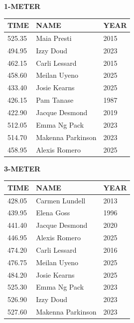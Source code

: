 \begin{table}[H]
\centering
\begin{minipage}[t]{0.6\textwidth}
\centering
\textbf{1-METER}\\[0.1cm]
\begin{tabular}{@{}p{1.8cm}p{2.8cm}p{1.2cm}@{}}
\hline
    \textbf{TIME} & \textbf{NAME} & \textbf{YEAR} \\
\hline
    525.35 & Maia Presti & 2015 \\
    494.95 & Izzy Doud & 2023 \\
    462.15 & Carli Lessard & 2015 \\
    458.60 & Meilan Uyeno & 2025 \\
    433.40 & Josie Kearns & 2025 \\
    426.15 & Pam Tanase & 1987 \\
    422.90 & Jacque Desmond & 2019 \\
    512.05 & Emma Ng Pack & 2023 \\
    514.70 & Makenna Parkinson & 2023 \\
    458.95 & Alexis Romero & 2025 \\
\hline
\end{tabular}
\end{minipage}
\end{table}

\begin{table}[H]
\centering
\begin{minipage}[t]{0.6\textwidth}
\centering
\textbf{3-METER}\\[0.1cm]
\begin{tabular}{@{}p{1.8cm}p{2.8cm}p{1.2cm}@{}}
\hline
    \textbf{TIME} & \textbf{NAME} & \textbf{YEAR} \\
\hline
    428.05 & Carmen Lundell & 2013 \\
    439.95 & Elena Goss & 1996 \\
    441.40 & Jacque Desmond & 2020 \\
    446.95 & Alexis Romero & 2025 \\
    474.20 & Carli Lessard & 2016 \\
    476.75 & Meilan Uyeno & 2025 \\
    484.20 & Josie Kearns & 2025 \\
    525.30 & Emma Ng Pack & 2023 \\
    526.90 & Izzy Doud & 2023 \\
    527.60 & Makenna Parkinson & 2023 \\
\hline
\end{tabular}
\end{minipage}
\end{table}

